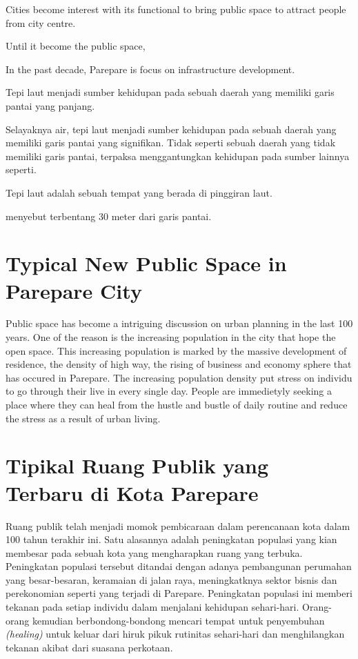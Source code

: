 \documentclass[11pt]{simart} %
\begin{document}
Cities become interest with its functional to bring public space to attract people from city centre.

Until it become the public space,

In the past decade, Parepare is focus on infrastructure development.

Tepi laut menjadi sumber kehidupan pada sebuah daerah yang memiliki garis pantai yang panjang.

Selayaknya air, tepi laut menjadi sumber kehidupan pada sebuah daerah yang memiliki garis pantai yang signifikan. Tidak seperti sebuah daerah yang tidak memiliki garis pantai, terpaksa menggantungkan kehidupan pada sumber lainnya seperti.

Tepi laut adalah sebuah tempat yang berada di pinggiran laut.

menyebut terbentang 30 meter dari garis pantai.

\section{Typical New Public Space in Parepare City}
Public space has become a intriguing discussion on urban planning in the last 100 years. One of the reason is the increasing population in the city that hope the open space. This increasing population is marked by the massive development of residence, the density of high way, the rising of business and economy sphere that has occured in Parepare. The increasing population density put stress on individu to go through their live in every single day. People are immedietyly seeking a place where they can heal from the hustle and bustle of daily routine and reduce the stress as a result of urban living.





\section{Tipikal Ruang Publik yang Terbaru di Kota Parepare}
Ruang publik telah menjadi momok pembicaraan dalam perencanaan kota dalam 100 tahun terakhir ini. Satu alasannya adalah peningkatan populasi yang kian membesar pada sebuah kota yang mengharapkan ruang yang terbuka. Peningkatan populasi tersebut ditandai dengan adanya pembangunan perumahan yang besar-besaran, keramaian di jalan raya, meningkatknya sektor bisnis dan perekonomian  seperti yang terjadi di Parepare. Peningkatan populasi ini memberi tekanan pada setiap individu dalam menjalani kehidupan sehari-hari.
Orang-orang kemudian berbondong-bondong mencari tempat untuk penyembuhan \textit{(healing)} untuk keluar dari hiruk pikuk rutinitas sehari-hari dan menghilangkan tekanan akibat dari suasana perkotaan.
\end{document}
